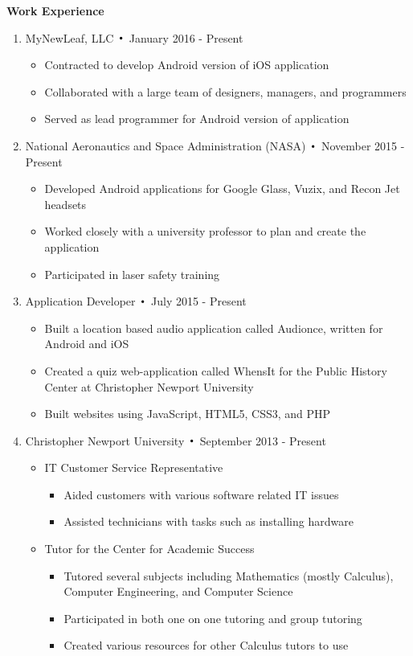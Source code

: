 \noindent\textbf{\large Work Experience}
\begin{enumerate}[label={\Roman*}.]

\item MyNewLeaf, LLC $\Bigcdot$ January 2016 - Present
\begin{itemize}
\item Contracted to develop Android version of iOS application
\item Collaborated with a large team of designers, managers, and programmers
\item Served as lead programmer for Android version of application
\end{itemize}

\item National Aeronautics and Space Administration (NASA) $\Bigcdot$ November 2015 - Present
\begin{itemize}
\item Developed Android applications for Google Glass, Vuzix, and Recon Jet headsets
\item Worked closely with a university professor to plan and create the application
\item Participated in laser safety training
\end{itemize}

\item Application Developer $\Bigcdot$ July 2015 - Present
\begin{itemize}
\item Built a location based audio application called Audionce, written for Android and iOS
\item Created a quiz web-application called WhensIt for the Public History Center at Christopher Newport
University
\item Built websites using JavaScript, HTML5, CSS3, and PHP
\end{itemize}

\item Christopher Newport University $\Bigcdot$ September 2013 - Present
\begin{itemize}
\item IT Customer Service Representative
\begin{itemize}
\item Aided customers with various software related IT issues
\item Assisted technicians with tasks such as installing hardware
\end{itemize}
\item Tutor for the Center for Academic Success
\begin{itemize}
\item Tutored several subjects including Mathematics (mostly Calculus), Computer Engineering, and
Computer Science
\item Participated in both one on one tutoring and group tutoring
\item Created various resources for other Calculus tutors to use
\end{itemize}
\end{itemize}


\end{enumerate}
